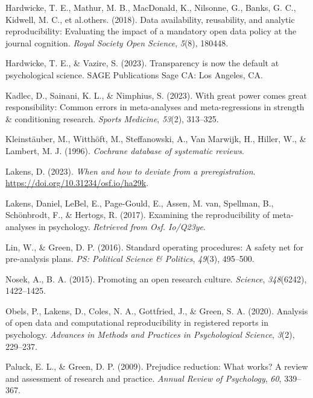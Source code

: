 \documentclass[
  man]{apa6}
\newlength{\cslhangindent}
\newenvironment{CSLReferences}[2] %
 {\begin{list}{}{%
  \setlength{\itemindent}{0pt}
  \setlength{\leftmargin}{0pt}
  \setlength{\parsep}{0pt}
  \ifodd #1
   \setlength{\leftmargin}{\cslhangindent}
   \setlength{\itemindent}{-1\cslhangindent}
  \fi
  \setlength{\itemsep}{#2\baselineskip}}}
 {\end{list}}
\begin{document}
\begin{CSLReferences}{1}{0}
Hardwicke, T. E., Mathur, M. B., MacDonald, K., Nilsonne, G., Banks, G. C., Kidwell, M. C., et al.others. (2018). Data availability, reusability, and analytic reproducibility: Evaluating the impact of a mandatory open data policy at the journal cognition. \emph{Royal Society Open Science}, \emph{5}(8), 180448.

Hardwicke, T. E., \& Vazire, S. (2023). Transparency is now the default at psychological science. SAGE Publications Sage CA: Los Angeles, CA.

Kadlec, D., Sainani, K. L., \& Nimphius, S. (2023). With great power comes great responsibility: Common errors in meta-analyses and meta-regressions in strength \& conditioning research. \emph{Sports Medicine}, \emph{53}(2), 313--325.

Kleinstäuber, M., Witthöft, M., Steffanowski, A., Van Marwijk, H., Hiller, W., \& Lambert, M. J. (1996). \emph{Cochrane database of systematic reviews}.

Lakens, D. (2023). \emph{When and how to deviate from a preregistration}. \url{https://doi.org/10.31234/osf.io/ha29k}.

Lakens, Daniel, LeBel, E., Page-Gould, E., Assen, M. van, Spellman, B., Schönbrodt, F., \& Hertogs, R. (2017). Examining the reproducibility of meta-analyses in psychology. \emph{Retrieved from Osf. Io/Q23ye}.

Lin, W., \& Green, D. P. (2016). Standard operating procedures: A safety net for pre-analysis plans. \emph{PS: Political Science \& Politics}, \emph{49}(3), 495--500.

Nosek, A., B. A. (2015). Promoting an open research culture. \emph{Science}, \emph{348}(6242), 1422--1425.

Obels, P., Lakens, D., Coles, N. A., Gottfried, J., \& Green, S. A. (2020). Analysis of open data and computational reproducibility in registered reports in psychology. \emph{Advances in Methods and Practices in Psychological Science}, \emph{3}(2), 229--237.

Paluck, E. L., \& Green, D. P. (2009). Prejudice reduction: What works? A review and assessment of research and practice. \emph{Annual Review of Psychology}, \emph{60}, 339--367.


\end{CSLReferences}
\end{document}
